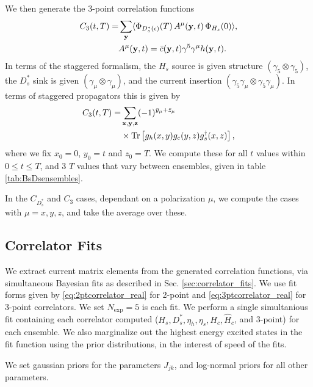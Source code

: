We then generate the 3-point correlation functions
\begin{align}
  C_3(t,T) =& \sum_{{\bf{y}}} \langle \Phi_{D_s^*(\epsilon)}(T)\, A^{\mu}({\bf{y}},t) \,\Phi_{H_s}(0) \rangle, \\
  &A^{\mu}({\bf{y}},t) = \bar{c}({\bf{y}},t) \gamma^5\gamma^{\mu} h({\bf{y}},t). \nonumber
\end{align}
In terms of the staggered formalism, the $H_s$ source is given structure $(\gamma_5\otimes \gamma_5)$, the $D_s^*$ sink is given $(\gamma_{\mu}\otimes \gamma_{\mu})$, and the current insertion $(\gamma_5\gamma_{\mu}\otimes \gamma_5\gamma_{\mu})$. In terms of staggered propagators this is given by
\begin{align}
  C_3(t,T) =& \sum_{{\bf{x},\bf{y},\bf{z}}} (-1)^{\bar{y}_{\mu}+\bar{z}_{\mu}}  \nonumber \\ &\times\text{Tr}\left[ g_h(x,y)g_c(y,z) g^{\dagger}_s(x,z) \right],
\end{align}
where we fix $x_0 = 0$, $y_0=t$ and $z_0=T$. We compute these for all $t$ values within $0\leq t\leq T$, and 3 $T$ values that vary between ensembles, given in table \ref{tab:BsDsensembles}.

In the $C_{D_s^*}$ and $C_3$ cases, dependant on a polarization $\mu$, we compute the cases with $\mu = x,y,z$, and take the average over these.

\subsection{Correlator Fits}
\label{sec:BsDsstar_fits}

We extract current matrix elements from the generated correlation functions, via simultaneous Bayesian fits as described in Sec. \ref{sec:correlator_fits}. We use fit forms given by \eqref{eq:2ptcorrelator_real} for 2-point and \eqref{eq:3ptcorrelator_real} for 3-point correlators. We set $N_{\text{exp}}=5$ is each fit. We perform a single simultanious fit containing each correlator computed ($H_s,D_s^*,\eta_h,\eta_s,H_c,\hat{H}_c$, and 3-point) for each ensemble. We also marginalize out the highest energy excited states in the fit function using the prior distributions, in the interest of speed of the fits.

We set gaussian priors for the parameters $J_{jk}$, and log-normal priors for all other parameters.

